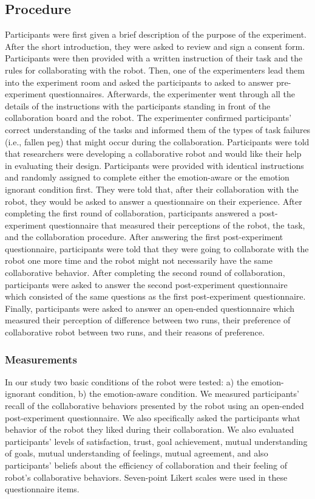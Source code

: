 \documentclass[12pt]{report}
\begin{document}
\subsection{Procedure}
\label{sec:procedure}
Participants were first given a brief description of the purpose of the
experiment. After the short introduction, they were asked to review and sign a
consent form. Participants were then provided with a written instruction of
their task and the rules for collaborating with the robot. Then, one of the
experimenters lead them into the experiment room and asked the participants
to asked to answer pre-experiment questionnaires. Afterwards, the experimenter
went through all the details of the instructions with the participants
standing in front of the collaboration board and the robot. The experimenter
confirmed participants' correct understanding of the tasks and informed them
of the types of task failures (i.e., fallen peg) that might occur during the
collaboration. Participants were told that researchers were developing a
collaborative robot and would like their help in evaluating their design.
Participants were provided with identical instructions and randomly assigned to
complete either the emotion-aware or the emotion ignorant condition first. They
were told that, after their collaboration with the robot, they would be asked to
answer a questionnaire on their experience. After completing the first round of
collaboration, participants answered a post-experiment questionnaire that
measured their perceptions of the robot, the task, and the collaboration
procedure. After answering the first post-experiment questionnaire, participants
were told that they were going to collaborate with the robot one more time and
the robot might not necessarily have the same collaborative behavior. After
completing the second round of collaboration, participants were asked to answer
the second post-experiment questionnaire which consisted of the same questions
as the first post-experiment questionnaire. Finally, participants were asked
to answer an open-ended questionnaire which measured their perception of
difference between two runs, their preference of collaborative robot between two
runs, and their reasons of preference.

\subsubsection{Measurements}
\label{sec:Measurements}
In our study two basic conditions of the robot were tested: a) the
emotion-ignorant condition, b) the emotion-aware condition. We measured
participants' recall of the collaborative behaviors presented by the robot using
an open-ended post-experiment questionnaire. We also specifically asked the
participants what behavior of the robot they liked during their collaboration.
We also evaluated participants' levels of satisfaction, trust, goal achievement,
mutual understanding of goals, mutual understanding of feelings, mutual
agreement, and also participants' beliefs about the efficiency of collaboration
and their feeling of robot's collaborative behaviors. Seven-point Likert scales
were used in these questionnaire items.
\end{document}
